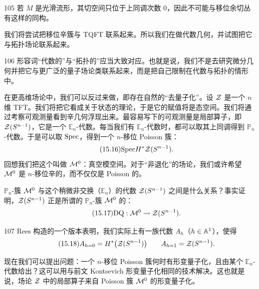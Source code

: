 \begin{srcrem}{105}
若 $M$ 是光滑流形，其切空间只位于上同调次数 $0$，因此不可能与移位余切丛有这样的同构。
\end{srcrem}

我们将尝试把移位辛簇与 TQFT 联系起来。所以我们在做代数几何，并试图把它与拓扑场论联系起来。

\begin{srcrem}{106}
形容词“代数的”与“拓扑的”应当大致对应。也就是说，我们不是去研究微分几何并把它与更广泛的量子场论类联系起来，而是把自己限制在代数与拓扑的情形中。
\end{srcrem}

在更高维场论中，我们可以反过来做，即存在自然的“去量子化”。设 $\mathcal{Z}$ 是一个 $n$ 维 TFT。我们将把它看成关于状态的理论，于是它的赋值将是态空间。我们将通过考察可观测量看到辛几何浮现出来。最容易写下的可观测量是局部算子，即 $\mathcal{Z}(S^{n-1})$，它是一个 $\mathbb{E}_n$-代数。每当我们有 $\mathbb{E}_n$-代数时，都可以取其上同调得到 $\mathbb{P}_n$-代数。于是可以取 $\mathrm{Spec}$，得到一个 $n$-移位 Poisson 簇：
\begin{equation}\tag{15.16}
\mathrm{Spec} H^*\mathcal{Z}(S^{n-1}).
\end{equation}
回想我们把这个叫做 $\mathcal{M}^0$：真空模空间。对于“非退化”的场论，我们或许希望 $\mathcal{M}^0$ 是 $n$-移位辛的，而不仅仅是 Poisson 的。

$\mathbb{P}_n$-簇 $\mathcal{M}^0$ 与这个稍微非交换（$\mathbb{E}_n$）的代数 $\mathcal{Z}(S^{n-1})$ 之间是什么关系？事实证明，$\mathcal{Z}(S^{n-1})$ 正是所谓的 $\mathbb{P}_n$-簇 $\mathcal{M}^0$ 的：
\begin{equation}\tag{15.17}
\mathrm{DQ}:\mathcal{M}^0\rightsquigarrow\mathcal{Z}(S^{n-1}).
\end{equation}

\begin{srcrem}{107}
Rees 构造的一个版本表明，我们实际上有一族代数 $A_h$（$h\in\mathbb{A}^1$），使得
\begin{equation}\tag{15.18}
A_{h=0}=H^*\bigl(\mathcal{Z}(S^{n-1})\bigr)\qquad A_{h=1}=\mathcal{Z}(S^{n-1}).
\end{equation}
\end{srcrem}

现在我们可以提出问题：一个 $n$-移位 Poisson 簇何时有形变量子化，且由某个 $\mathbb{E}_n$-代数给出？这可以用与前文 Kontsevich 形变量子化相同的技术解决。这也就是说，场论 $\mathcal{Z}$ 中的局部算子来自 Poisson 簇 $\mathcal{M}^0$ 的形变量子化。

